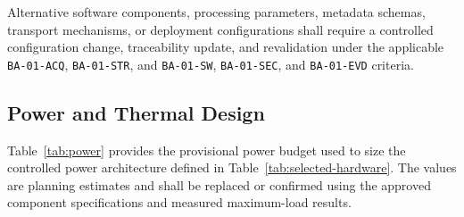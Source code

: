 \documentclass[11pt,a4paper]{article}
\begin{document}
	Alternative software components, processing parameters, metadata schemas,
	transport mechanisms, or deployment configurations shall require a controlled
	configuration change, traceability update, and revalidation under the
	applicable \texttt{BA-01-ACQ}, \texttt{BA-01-STR}, and
	\texttt{BA-01-SW}, \texttt{BA-01-SEC}, and \texttt{BA-01-EVD} criteria.
	
	\subsection*{Power and Thermal Design}
	
	Table~\ref{tab:power} provides the provisional power budget used to size the
	controlled power architecture defined in
	Table~\ref{tab:selected-hardware}. The values are planning estimates and shall
	be replaced or confirmed using the approved component specifications and
	measured maximum-load results.
	
\end{document}
